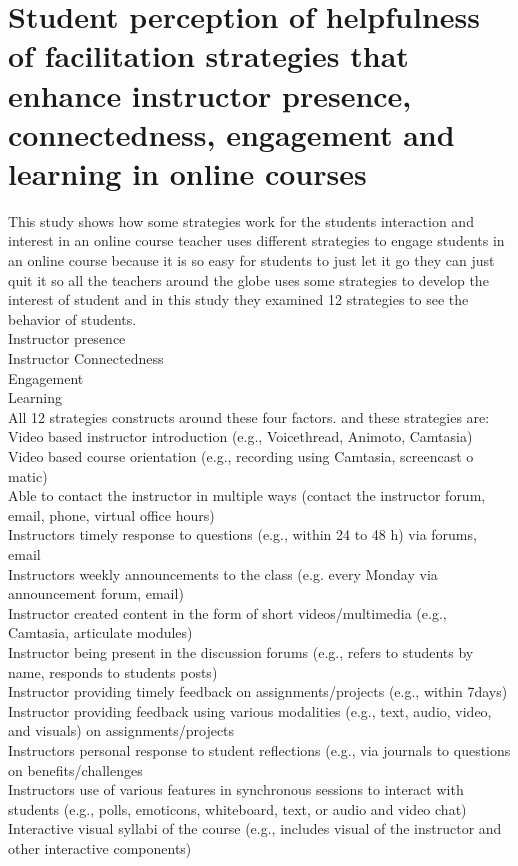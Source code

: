 \documentclass[12pt]{article}
\begin{document}
\section{Student perception of helpfulness of facilitation strategies that enhance instructor presence, connectedness, engagement and learning in online courses}
This study shows how some strategies work for the students interaction and interest in an online course teacher uses different strategies to engage students in an online course because it is so easy for students to just let it go they can just quit it so all the teachers around the globe uses some strategies to develop the interest of student and in this study they examined 12 strategies to see the behavior of students.\\
Instructor presence\\
Instructor Connectedness\\
Engagement \\
Learning\\
All 12 strategies constructs around these four factors. and these strategies are:\\
Video based instructor introduction (e.g., Voicethread, Animoto, Camtasia)\\
Video based course orientation (e.g., recording using Camtasia, screencast o matic)\\
Able to contact the instructor in multiple ways (contact the instructor forum, email, phone, virtual office hours)\\
Instructors timely response to questions (e.g., within 24 to 48 h) via forums, email\\
Instructors weekly announcements to the class (e.g. every Monday via announcement forum, email)\\
Instructor created content in the form of short videos/multimedia (e.g., Camtasia, articulate modules)\\
Instructor being present in the discussion forums (e.g., refers to students by name, responds to students posts)\\
Instructor providing timely feedback on assignments/projects (e.g., within 7days)\\
Instructor providing feedback using various modalities (e.g., text, audio, video, and visuals) on assignments/projects\\
Instructors personal response to student reflections (e.g., via journals to questions on benefits/challenges\\
Instructors use of various features in synchronous sessions to interact with students (e.g., polls, emoticons, whiteboard, text, or audio and video chat)\\
Interactive visual syllabi of the course (e.g., includes visual of the instructor and other interactive components)\\
\end{document}
